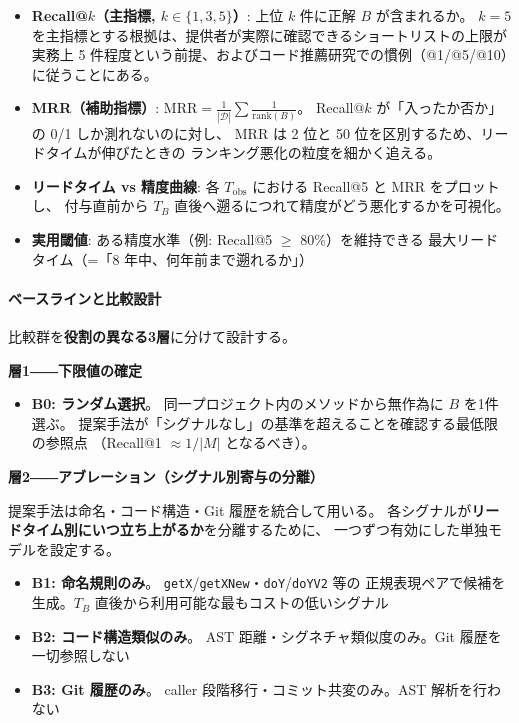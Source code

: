 \documentclass[a4paper,12pt]{article}
\begin{document}
\begin{itemize}
  \item \textbf{Recall@$k$（主指標, $k \in \{1,3,5\}$）}:
        上位 $k$ 件に正解 $B$ が含まれるか。
        $k=5$ を主指標とする根拠は、提供者が実際に確認できるショートリストの上限が
        実務上 5 件程度という前提、およびコード推薦研究での慣例（@1/@5/@10）に従うことにある。
  \item \textbf{MRR（補助指標）}:
        $\text{MRR} = \frac{1}{|\mathcal{D}|} \sum \frac{1}{\text{rank}(B)}$。
        Recall@$k$ が「入ったか否か」の 0/1 しか測れないのに対し、
        MRR は 2 位と 50 位を区別するため、リードタイムが伸びたときの
        ランキング悪化の粒度を細かく追える。
  \item \textbf{リードタイム vs 精度曲線}: 各 $T_{\text{obs}}$ における Recall@5 と MRR をプロットし、
        付与直前から $T_B$ 直後へ遡るにつれて精度がどう悪化するかを可視化。
  \item \textbf{実用閾値}: ある精度水準（例: Recall@5 $\geq$ 80\%）を維持できる
        最大リードタイム（=「8 年中、何年前まで遡れるか」）
\end{itemize}

\paragraph{ベースラインと比較設計}

比較群を\textbf{役割の異なる3層}に分けて設計する。

\medskip
\noindent\textbf{層1――下限値の確定}

\begin{itemize}
  \item \textbf{B0: ランダム選択}。
        同一プロジェクト内のメソッドから無作為に $B$ を1件選ぶ。
        提案手法が「シグナルなし」の基準を超えることを確認する最低限の参照点
        （Recall@1 $\approx 1/|M|$ となるべき）。
\end{itemize}

\medskip
\noindent\textbf{層2――アブレーション（シグナル別寄与の分離）}

提案手法は命名・コード構造・Git 履歴を統合して用いる。
各シグナルが\textbf{リードタイム別にいつ立ち上がるか}を分離するために、
一つずつ有効にした単独モデルを設定する。

\begin{itemize}
  \item \textbf{B1: 命名規則のみ}。
        \texttt{getX}/\texttt{getXNew}・\texttt{doY}/\texttt{doYV2} 等の
        正規表現ペアで候補を生成。$T_B$ 直後から利用可能な最もコストの低いシグナル
  \item \textbf{B2: コード構造類似のみ}。
        AST 距離・シグネチャ類似度のみ。Git 履歴を一切参照しない
  \item \textbf{B3: Git 履歴のみ}。
        caller 段階移行・コミット共変のみ。AST 解析を行わない
\end{itemize}
\end{document}
